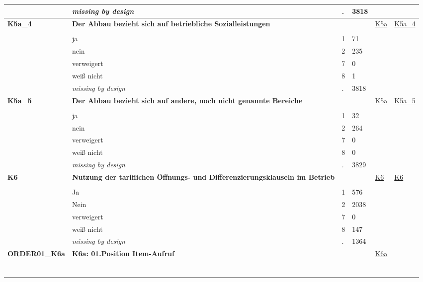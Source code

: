 \begin{longtable}{| L{2.45cm} | L{6cm} | C{1.5cm} | R{1cm} | C{2.25cm} | C{2.25cm} |}
   & \textit{missing by design} & \textit{.} & 3818 &  &  \\ 
   \midrule
\textbf{K5a\_4}\label{var:K5a:4} & \textbf{Der Abbau bezieht sich auf betriebliche Sozialleistungen} &  &  & \hyperref[K5a]{K5a} & \hyperref[var:suf:K5a:4]{K5a\_4} \\ 
   &  &  &  &  &  \\ 
   & ja & 1 & 71 &  &  \\ 
   & nein & 2 & 235 &  &  \\ 
   & verweigert & 7 & 0 &  &  \\ 
   & weiß nicht & 8 & 1 &  &  \\ 
   & \textit{missing by design} & \textit{.} & 3818 &  &  \\ 
   \midrule
\textbf{K5a\_5}\label{var:K5a:5} & \textbf{Der Abbau bezieht sich auf andere, noch nicht genannte Bereiche} &  &  & \hyperref[K5a]{K5a} & \hyperref[var:suf:K5a:5]{K5a\_5} \\ 
   &  &  &  &  &  \\ 
   & ja & 1 & 32 &  &  \\ 
   & nein & 2 & 264 &  &  \\ 
   & verweigert & 7 & 0 &  &  \\ 
   & weiß nicht & 8 & 0 &  &  \\ 
   & \textit{missing by design} & \textit{.} & 3829 &  &  \\ 
   \midrule
\textbf{K6}\label{var:K6} & \textbf{Nutzung der tariflichen Öffnungs- und Differenzierungsklauseln im Betrieb} &  &  & \hyperref[K6]{K6} & \hyperref[var:suf:K6]{K6} \\ 
   &  &  &  &  &  \\ 
   & Ja & 1 & 576 &  &  \\ 
   & Nein & 2 & 2038 &  &  \\ 
   & verweigert & 7 & 0 &  &  \\ 
   & weiß nicht & 8 & 147 &  &  \\ 
   & \textit{missing by design} & \textit{.} & 1364 &  &  \\ 
   \midrule
\textbf{ORDER01\_K6a}\label{var:ORDER01:K6a} & \textbf{K6a: 01.Position Item-Aufruf} &  &  & \hyperref[K6a]{K6a} & \hyperref[var:suf:]{} \\ 
   & \protect\subsection[Variablen ORDER01\_K6a bis K10]{} &  &  &  &  \\ 

\end{longtable}
